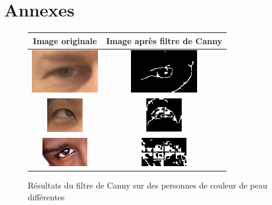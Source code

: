 \section{Annexes}

\renewcommand{\figurename}{Annexe}
\captionsetup{list=no}

\setcounter{figure}{0}

\begin{figure}[H]
  \center
  \begin{tabular}{|c|c|}
    \hline
    Image originale & Image après filtre de Canny\\
    \hline
    \includegraphics{image/original.png} & \includegraphics{image/canny_final.png}\\
    \hline
    \includegraphics{image/original_asiatique.png} & \includegraphics{image/cannyAsiatique.png}\\
    \hline
    \includegraphics{image/original_black.png} & \includegraphics{image/cannyBlack.png}\\
    \hline
  \end{tabular}
  \caption{Résultats du filtre de Canny sur des personnes de couleur de peau différentes}
\end{figure}

